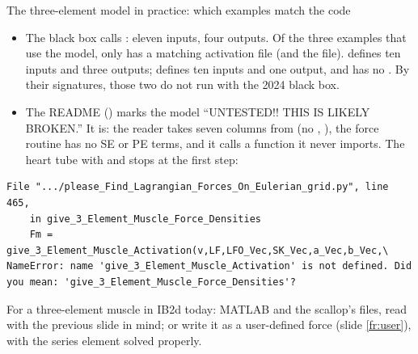\documentclass[aspectratio=169,11pt]{beamer}
\begin{document}
\begin{frame}[fragile]{The three-element model in practice: which examples match the code}
\label{fr:hill3state}
\small
\begin{itemize}
  \item {} The black box calls \allowbreak{}\allowbreak{}\allowbreak{}: eleven inputs, four outputs. Of the three examples that use the model, only  has a matching activation file (and the  file).  defines ten inputs and three outputs;  defines ten inputs and one output, and has no . By their signatures, those two do not run with the 2024 black box.
  \item {} The README () marks the model ``UNTESTED!! THIS IS LIKELY BROKEN.'' It is: the reader takes seven columns from  (no , ), the force routine has no SE or PE terms, and it calls a function it never imports. The heart tube with  and  stops at the first step:
\end{itemize}
\vspace{-1mm}
\begin{lstlisting}[style=tiny]
  File ".../please_Find_Lagrangian_Forces_On_Eulerian_grid.py", line 465,
    in give_3_Element_Muscle_Force_Densities
    Fm = give_3_Element_Muscle_Activation(v,LF,LFO_Vec,SK_Vec,a_Vec,b_Vec,\
NameError: name 'give_3_Element_Muscle_Activation' is not defined. Did you mean: 'give_3_Element_Muscle_Force_Densities'?
\end{lstlisting}
\vspace{-1mm}
\small For a three-element muscle in IB2d today: MATLAB and the scallop's files, read with the previous slide in mind; or write it as a user-defined force (slide \ref{fr:user}), with the series element solved properly.
\end{frame}
\end{document}
